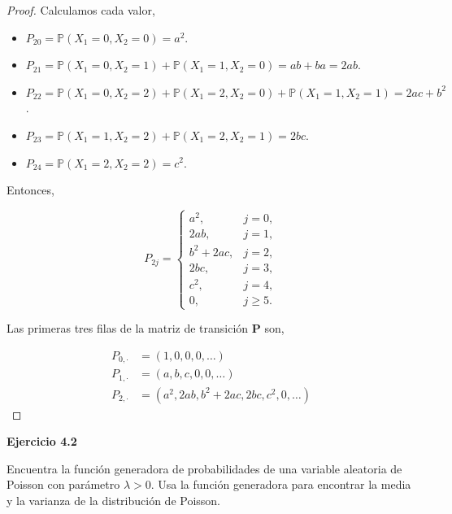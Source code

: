 \documentclass{article}
\begin{document}
\begin{proof}
Calculamos cada valor,

\begin{itemize}
    \item $P_{20} = \mathbb{P}(X_1 = 0, X_2 = 0) = a^2$.
    \item $P_{21} = \mathbb{P}(X_1 = 0, X_2 = 1) + \mathbb{P}(X_1 = 1, X_2 = 0) = ab + ba = 2ab$.
    \item $P_{22} = \mathbb{P}(X_1 = 0, X_2 = 2) + \mathbb{P}(X_1 = 2, X_2 = 0) + \mathbb{P}(X_1 = 1, X_2 = 1) = 2ac + b^2$.
    \item $P_{23} = \mathbb{P}(X_1 = 1, X_2 = 2) + \mathbb{P}(X_1 = 2, X_2 = 1) = 2bc$.
    \item $P_{24} = \mathbb{P}(X_1 = 2, X_2 = 2) = c^2$.
\end{itemize}

Entonces,

\[
P_{2j} =
\begin{cases}
a^2, & j = 0, \\
2ab, & j = 1, \\
b^2 + 2ac, & j = 2, \\
2bc, & j = 3, \\
c^2, & j = 4, \\
0, & j \geq 5.
\end{cases}
\]

Las primeras tres filas de la matriz de transición $\mathbf{P}$ son,

\[
\begin{aligned}
P_{0,\cdot} &= (1, 0, 0, 0, \dots) \\
P_{1,\cdot} &= (a, b, c, 0, 0, \dots) \\
P_{2,\cdot} &= (a^2, 2ab, b^2 + 2ac, 2bc, c^2, 0, \dots)
\end{aligned}
\]
\end{proof}

\textbf{Ejercicio 4.2}

Encuentra la función generadora de probabilidades de una variable aleatoria de Poisson con parámetro $\lambda > 0$. Usa la función generadora para encontrar la media y la varianza de la distribución de Poisson.
\end{document}
